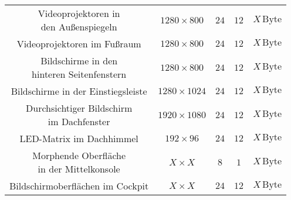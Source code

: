\begin{table}[hbt]
\begin{tabular}{c|cccc}
		\parbox[t]{0.4\linewidth}{\centering Videoprojektoren in\\den Außenspiegeln} & $ 1280 \times 800 $ & $ 24 $ & $ 12 $ &   $ X\,\mathrm{Byte} $ \\ 
		\parbox[t]{0.4\linewidth}{\centering Videoprojektoren im Fußraum} & $ 1280 \times 800 $ & $ 24 $ & $ 12 $ & $ X\,\mathrm{Byte} $ \\
		\parbox[t]{0.4\linewidth}{\centering Bildschirme in den\\hinteren Seitenfenstern} & $ 1280 \times 800 $ & $ 24 $ & $ 12 $ & $ X\,\mathrm{Byte} $ \\
		\parbox[t]{0.4\linewidth}{\centering Bildschirme in der Einstiegsleiste} &  $ 1280 \times 1024 $ & $ 24 $ & $ 12 $ & $ X\,\mathrm{Byte} $ \\
		\parbox[t]{0.4\linewidth}{\centering Durchsichtiger Bildschirm\\im Dachfenster} & $ 1920 \times 1080 $ & $ 24 $ & $ 12 $ & $ X\,\mathrm{Byte} $ \\
		LED-Matrix im Dachhimmel & $ 192 \times 96 $ & $ 24 $ & $ 12 $ & $ X\,\mathrm{Byte} $ \\
		\parbox[t]{0.4\linewidth}{\centering Morphende Oberfläche\\in der Mittelkonsole} & $ X \times X $ & $ 8 $ & $ 1 $ & $ X\,\mathrm{Byte} $ \\
		\parbox[t]{0.4\linewidth}{\centering Bildschirmoberflächen im Cockpit} & $ X \times X $ & $ 24 $ & $ 12 $ & $ X\,\mathrm{Byte} $ \\
	\end{tabular} 
\end{table}
